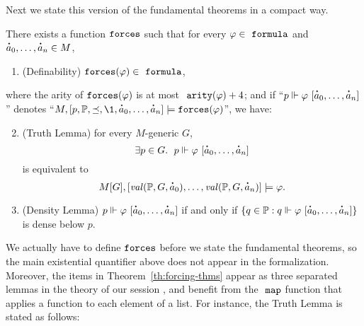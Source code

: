 Next we state this version of the fundamental theorems in a compact
way.
\begin{theorem}\label{th:forcing-thms}
  There exists a function  $\mathop{\mathtt{forces}}$
  such that for every
  $\phi\in\formula$ and $\punto{a}_0,\dots,\punto{a}_n\in M$,
  \begin{enumerate}
  \item\label{item:definability} (Definability)
    $\forceisa(\phi)\in\formula$, 
  \end{enumerate}
  where the 
  arity of $\mathop{\mathtt{forces}}(\varphi)$ is at most $\isatt{arity}(\phi) + 4$; and if
  “$p \forces \phi\ [\punto{a}_0,\dots,\punto{a}_n]$”
  denotes
  “$M, [p,\PP,\preceq,\1, \punto{a}_0,\dots,\punto{a}_n]  \models
  \forceisa(\phi)$”, we have:
  \begin{enumerate}
    \setcounter{enumi}{1}
  \item\label{item:truth-lemma} (Truth Lemma) for every $M$-generic $G$,
    \[
      \exists p\in G.\ \; p \forces \phi\ [\punto{a}_0,\dots,\punto{a}_n]
    \]
    is equivalent to 
    \[
      M[G], [\val(\PP,G,\punto{a}_0),\dots,\val(\PP,G,\punto{a}_n)]
      \models \phi.
    \]
  \item \label{item:density-lemma} (Density Lemma) $p \forces \phi\ [\punto{a}_0,\dots,\punto{a}_n]$
    if and only if 
    $\{q\in \PP :  q \forces \phi\ [\punto{a}_0,\dots,\punto{a}_n]\}$
    is dense below $p$.
  \end{enumerate}
\end{theorem}
We actually have to define $\mathop{\mathtt{forces}}$ before we state the fundamental
theorems, so the main existential quantifier above does not appear in the
formalization.
Moreover, the items in Theorem~\ref{th:forcing-thms} appear as three
separated lemmas in the theory
 of our
 session \cite{Independence_CH-AFP},
and benefit from the $\isatt{map}$ function that applies a function to
each element of a list. For instance, the Truth Lemma is stated as
follows:
